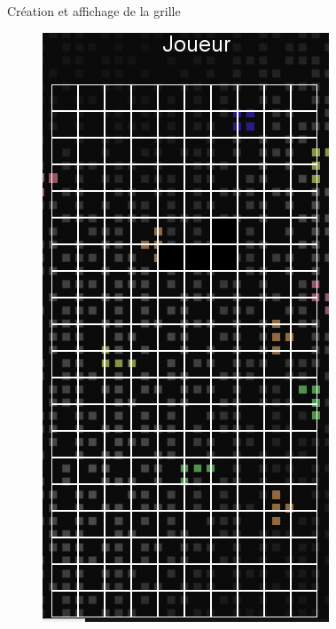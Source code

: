 \documentclass{beamer}
\begin{document}
\begin{frame}{Création et affichage de la grille}
\begin{figure}[t]
        	\includegraphics[scale=0.25]{images/grille_afficher.PNG}
        	
		\end{figure}
		
	\end{frame}
	
\end{document}
